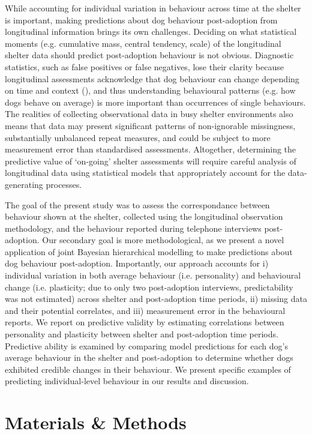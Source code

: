\documentclass[12pt]{article}
\begin{document}
While accounting for individual variation in behaviour across time at the shelter is important, making predictions about dog behaviour post-adoption from longitudinal information brings its own challenges. Deciding on what statistical moments (e.g. cumulative mass, central tendency, scale) of the longitudinal shelter data should predict post-adoption behaviour is not obvious. Diagnostic statistics, such as false positives or false negatives, lose their clarity because longitudinal assessments acknowledge that dog behaviour can change depending on time and context (\cite{goold2017modelling}), and thus understanding behavioural patterns (e.g. how dogs behave on average) is more important than occurrences of single behaviours. The realities of collecting observational data in busy shelter environments also means that data may present significant patterns of non-ignorable missingness, substantially unbalanced repeat measures, and could be subject to more measurement error than standardised assessments. Altogether, determining the predictive value of `on-going' shelter assessments will require careful analysis of longitudinal data using statistical models that appropriately account for the data-generating processes.

The goal of the present study was to assess the correspondance between behaviour shown at the shelter, collected using the longitudinal observation methodology, and the behaviour reported during telephone interviews post-adoption. Our secondary goal is more methodological, as we present a novel application of joint Bayesian hierarchical modelling to make predictions about dog behaviour post-adoption. Importantly, our approach accounts for i) individual variation in both average behaviour (i.e. personality) and behavioural change (i.e. plasticity; due to only two post-adoption interviews, predictability was not estimated) across shelter and post-adoption time periods, ii) missing data and their potential correlates, and iii) measurement error in the behavioural reports. We report on predictive validity by estimating correlations between personality and plasticity between shelter and post-adoption time periods. Predictive ability is examined by comparing model predictions for each dog's average behaviour in the shelter and post-adoption to determine whether dogs exhibited credible changes in their behaviour. We present specific examples of predicting individual-level behaviour in our results and discussion.

\section{Materials \& Methods}
\end{document}
